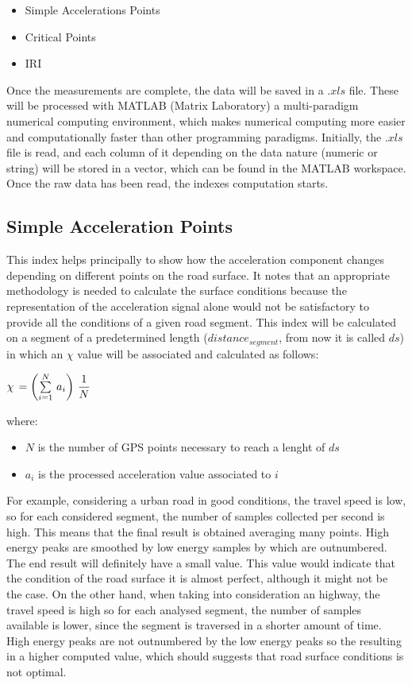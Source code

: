 \documentclass[tesi]{subfiles}
\begin{document}
 \begin{itemize}
 \item Simple Accelerations Points
 \item Critical Points
 \item IRI
 \end{itemize}
 
Once the measurements are complete, the data will be saved in a $.xls$ file.
These will be processed with MATLAB (Matrix Laboratory) a multi-paradigm numerical computing environment, which makes numerical computing more easier and computationally faster than other programming paradigms.
Initially, the $.xls$ file is read, and each column of it depending on the data nature (numeric or string) will be stored in a vector, which can be found in the MATLAB workspace.
Once the raw data has been read, the indexes computation starts.

\subsection{Simple Acceleration Points}\label{ssc:Simple Accelerations Points}
This index helps principally to show how the acceleration component changes depending on different points on the road surface.
It notes that an appropriate methodology is needed to calculate the surface conditions because the representation of the acceleration signal alone would not be satisfactory to provide all the conditions of a given road segment. This index will be calculated on a segment of a predetermined length ($distance_{segment}$, from now it is called $ds$) in which an $\chi$ value will be associated and calculated as follows:

\begin{center}
{\large  $\chi \thinspace = \left( \sum \limits_{i=1}^{N} \thinspace a_{i} \right) \thinspace \dfrac{1}{N}$}
\end{center}\label{eq:sap}
where:
\begin{itemize}
\item $N$ is the number of GPS points necessary to reach a lenght of $ds$
\item $a_{i}$ is the processed acceleration value associated to $i$
\end{itemize}

For example, considering a urban road in good conditions, the travel speed is low, so for each considered segment, the number of samples collected per second is high.
This means that the final result is obtained averaging many points.
High energy peaks are smoothed by low energy samples by which are outnumbered.
The end result will definitely have a small value.
This value would indicate that the condition of the road surface it is almost perfect, although it might not be the case.
On the other hand, when taking into consideration an highway, the travel speed is  high so for each analysed segment, the number of samples available is lower, since the segment is traversed in a shorter amount of time.
High energy peaks are not outnumbered by the low energy peaks so the resulting in a higher computed value, which should suggests that road surface conditions is not optimal.
\end{document}
